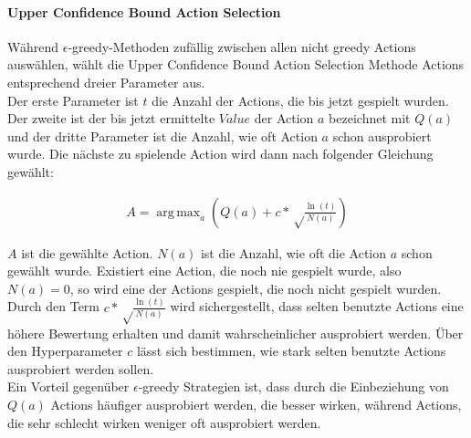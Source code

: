 \documentclass[11pt]{scrartcl}
\DeclareMathOperator*{\argmax}{arg\,max}
\begin{document}
\paragraph{Upper Confidence Bound Action Selection}
Während $\epsilon$-greedy-Methoden zufällig zwischen allen nicht greedy Actions
auswählen, wählt die Upper Confidence Bound Ac\-tion Selection Methode Actions entsprechend
dreier Parameter aus.\\
Der erste Parameter ist $t$ die Anzahl der Actions, die bis jetzt gespielt wurden. Der
zweite ist der bis jetzt ermittelte $Value$ der Action $a$ bezeichnet mit $Q(a)$ und der
dritte Parameter ist die Anzahl, wie oft Action $a$ schon ausprobiert wurde. Die nächste
zu spielende Action wird dann nach folgender Gleichung gewählt:

\begin{align}
A = \argmax_a\left( Q(a) + c*\sqrt\frac{\ln(t)}{N(a)} \right)
\end{align}

\noindent
$A$ ist die gewählte Action. $N(a)$ ist die Anzahl, wie oft die Action $a$ schon gewählt
wurde. Existiert eine Action, die noch nie gespielt wurde, also $N(a)=0$, so wird eine der
Actions gespielt, die noch nicht gespielt wurden. Durch den Term
$c*\sqrt\frac{\ln(t)}{N(a)}$ wird sichergestellt, dass selten benutzte Actions eine höhere
Bewertung erhalten und damit wahrscheinlicher ausprobiert werden. Über den Hyperparameter
$c$ lässt sich bestimmen, wie stark selten benutzte Actions ausprobiert werden sollen.\\
Ein Vorteil gegenüber $\epsilon$-greedy Strategien ist, dass durch die Einbeziehung von
$Q(a)$ Actions häufiger ausprobiert werden, die besser wirken, während Actions, die sehr
schlecht wirken weniger oft ausprobiert werden.
\end{document}
